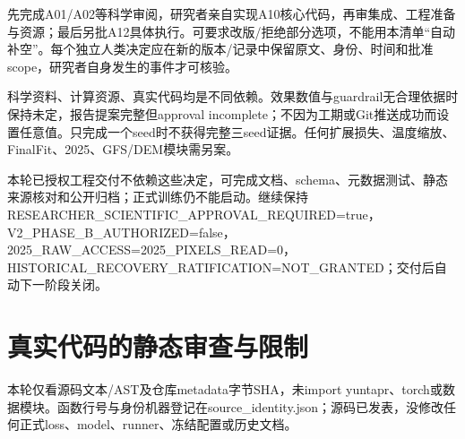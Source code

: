 \documentclass[UTF8,fontset=fandol,10pt]{ctexart}
\begin{document}
先完成A01/\allowbreak{}A02等科学审阅，研究者亲自实现A10核心代码，再审集成、工程准备与资源；最后另批A12具体执行。可要求改版/\allowbreak{}拒绝部分选项，不能用本清单“自动补空”。每个独立人类决定应在新的版本/\allowbreak{}记录中保留原文、身份、时间和批准scope，研究者自身发生的事件才可核验。

科学资料、计算资源、真实代码均是不同依赖。效果数值与guardrail无合理依据时保持未定，报告提案完整但approval incomplete；不因为工期或Git推送成功而设置任意值。只完成一个seed时不获得完整三seed证据。任何扩展损失、温度缩放、FinalFit、2025、GFS/\allowbreak{}DEM模块需另案。

本轮已授权工程交付不依赖这些决定，可完成文档、schema、元数据测试、静态来源核对和公开归档；正式训练仍不能启动。继续保持RESEARCHER\_\allowbreak{}SCIENTIFIC\_\allowbreak{}APPROVAL\_\allowbreak{}REQUIRED=true，V2\_\allowbreak{}PHASE\_\allowbreak{}B\_\allowbreak{}AUTHORIZED=false，2025\_\allowbreak{}RAW\_\allowbreak{}ACCESS=2025\_\allowbreak{}PIXELS\_\allowbreak{}READ=0，HISTORICAL\_\allowbreak{}RECOVERY\_\allowbreak{}RATIFICATION=NOT\_\allowbreak{}GRANTED；交付后自动下一阶段关闭。
\clearpage\section{真实代码的静态审查与限制}

本轮仅看源码文本/\allowbreak{}AST及仓库metadata字节SHA，未import yuntapr、torch或数据模块。函数行号与身份机器登记在source\_\allowbreak{}identity.json；源码已发表，没修改任何正式loss、model、runner、冻结配置或历史文档。
\end{document}
